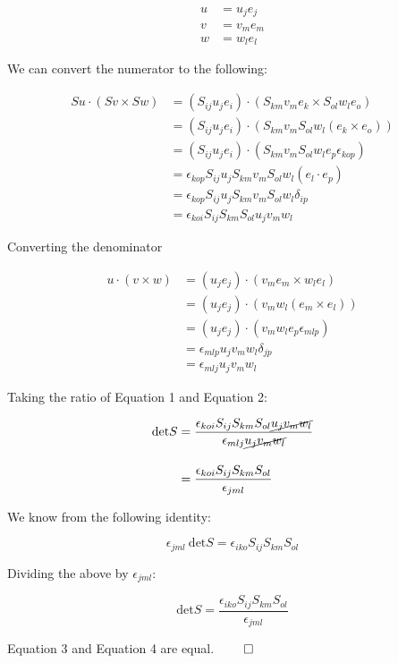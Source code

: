 \begin{problem}
\begin{enumerate}
\begin{align*}
u&=u_{j}e_{j}\\[10pt]
v&=v_{m}e_{m}\\[10pt]
w&=w_{l}e_{l}
\end{align*}


We can convert the numerator to the following:


\begin{align*}
Su\cdot(Sv\times Sw)&=(S_{ij}u_{j}e_{i})\cdot(S_{km}v_{m}e_{k}\times S_{ol}w_{l}e_{o})\\[10pt]
&=(S_{ij}u_{j}e_{i})\cdot(S_{km}v_{m}S_{ol}w_{l}(e_{k}\times e_{o}))\\[10pt]
&=(S_{ij}u_{j}e_{i})\cdot(S_{km}v_{m}S_{ol}w_{l}e_{p}\epsilon_{kop})\\[10pt]
&=\epsilon_{kop}S_{ij}u_{j}S_{km}v_{m}S_{ol}w_{l}(e_{l}\cdot e_{p})\\[10pt]
&=\epsilon_{kop}S_{ij}u_{j}S_{km}v_{m}S_{ol}w_{l}\delta_{ip}\\[10pt]
&=\epsilon_{koi}S_{ij}S_{km}S_{ol}u_{j}v_{m}w_{l}\tag{1}
\end{align*}
\pagebreak

Converting the denominator


\begin{align*}
u\cdot(v\times w)&=
(u_{j}e_{j})\cdot(v_{m}e_{m}\times w_{l}e_{l})\\[10pt]
&=(u_{j}e_{j})\cdot(v_{m}w_{l}(e_{m}\times e_{l}))\\[10pt]
&=(u_{j}e_{j})\cdot(v_{m}w_{l}e_{p}\epsilon_{mlp})\\[10pt]
&=\epsilon_{mlp}u_{j}v_{m}w_{l}\delta_{jp}\\[10pt]
&=\epsilon_{mlj}u_{j}v_{m}w_{l}\tag{2}
\end{align*}


Taking the ratio of Equation 1 and Equation 2:


\begin{align*}
\text{det}S &=\frac{\epsilon_{koi}S_{ij}S_{km}S_{ol}\cancel{ u_{j}v_{m}w_{l} }}{\epsilon_{mlj}\cancel{ u_{j}v_{m}w_{l} }}\\[10pt]
&=\frac{\epsilon_{koi}S_{ij}S_{km}S_{ol}}{\epsilon_{jml}}
\end{align*}


We know from the following identity:

$$
\epsilon_{jml} \ \text{det}S=\epsilon_{iko}S_{ij}S_{km}S_{ol}
$$

Dividing the above by $\epsilon_{jml}$:

$$
\text{det}S = \frac{\epsilon_{iko}S_{ij}S_{km}S_{ol}}{\epsilon_{jml}}
$$


Equation 3 and Equation 4 are equal. $\qed$
\end{enumerate}
\end{problem}
\pagebreak